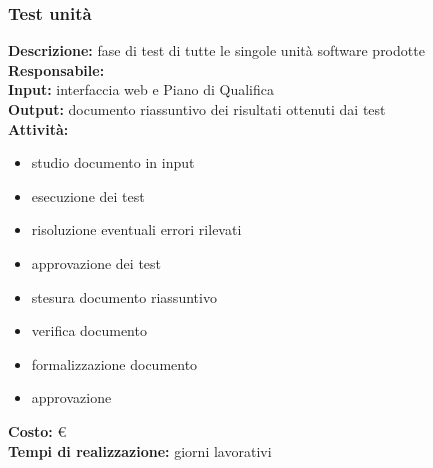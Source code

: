 \subsubsection{Test unità}

\textbf{Descrizione:} fase di test di tutte le singole unità software prodotte \\
\linebreak
\textbf{Responsabile:} \\
\linebreak
\textbf{Input:} interfaccia web e Piano di Qualifica\\
\linebreak
\textbf{Output:} documento riassuntivo dei risultati ottenuti dai test\\
\linebreak
\textbf{Attività:}
\begin{itemize}
\item studio documento in input
\item esecuzione dei test
\item risoluzione eventuali errori rilevati
\item approvazione dei test
\item stesura documento riassuntivo
\item verifica documento
\item formalizzazione documento
\item approvazione
\end{itemize}
\textbf{Costo:} \euro \\
\textbf{Tempi di realizzazione:}  giorni lavorativi


